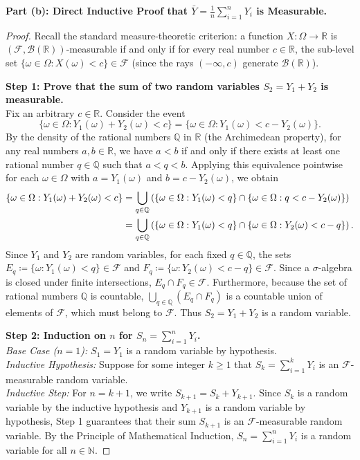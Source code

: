 \documentclass[11pt, letterpaper]{article}
\theoremstyle{definition}
\theoremstyle{remark}
\newcommand{\R}{\mathbb{R}}
\newcommand{\N}{\mathbb{N}}
\newcommand{\Q}{\mathbb{Q}}
\newcommand{\F}{\mathcal{F}}
\begin{document}
\textbf{Part (b): Direct Inductive Proof that $\bar{Y} = \frac{1}{n}\sum_{i=1}^n Y_i$ is Measurable.}
\begin{proof}
Recall the standard measure-theoretic criterion: a function $X : \Omega \to \R$ is $(\F, \mathcal{B}(\R))$-measurable if and only if for every real number $c \in \R$, the sub-level set $\{\omega \in \Omega : X(\omega) < c\} \in \F$ (since the rays $(-\infty, c)$ generate $\mathcal{B}(\R)$).

\textbf{Step 1: Prove that the sum of two random variables $S_2 = Y_1 + Y_2$ is measurable.} \\ \relax
Fix an arbitrary $c \in \R$. Consider the event
\[
    \{\omega \in \Omega : Y_1(\omega) + Y_2(\omega) < c\} = \{\omega \in \Omega : Y_1(\omega) < c - Y_2(\omega)\}.
\]
By the density of the rational numbers $\Q$ in $\R$ (the Archimedean property), for any real numbers $a, b \in \R$, we have $a < b$ if and only if there exists at least one rational number $q \in \Q$ such that $a < q < b$. Applying this equivalence pointwise for each $\omega \in \Omega$ with $a = Y_1(\omega)$ and $b = c - Y_2(\omega)$, we obtain
\begin{align*}
    \{\omega \in \Omega : Y_1(\omega) + Y_2(\omega) < c\} 
    &= \bigcup_{q \in \Q} \left( \{\omega \in \Omega : Y_1(\omega) < q\} \cap \{\omega \in \Omega : q < c - Y_2(\omega)\} \right) \\ \relax
    &= \bigcup_{q \in \Q} \left( \{\omega \in \Omega : Y_1(\omega) < q\} \cap \{\omega \in \Omega : Y_2(\omega) < c - q\} \right).
\end{align*}
Since $Y_1$ and $Y_2$ are random variables, for each fixed $q \in \Q$, the sets $E_q \coloneqq \{\omega : Y_1(\omega) < q\} \in \F$ and $F_q \coloneqq \{\omega : Y_2(\omega) < c - q\} \in \F$. Since a $\sigma$-algebra is closed under finite intersections, $E_q \cap F_q \in \F$. Furthermore, because the set of rational numbers $\Q$ is countable, $\bigcup_{q \in \Q} (E_q \cap F_q)$ is a countable union of elements of $\F$, which must belong to $\F$. Thus $S_2 = Y_1 + Y_2$ is a random variable.

\textbf{Step 2: Induction on $n$ for $S_n = \sum_{i=1}^n Y_i$.} \\ \relax
\emph{Base Case ($n=1$):} $S_1 = Y_1$ is a random variable by hypothesis. \\ \relax
\emph{Inductive Hypothesis:} Suppose for some integer $k \ge 1$ that $S_k = \sum_{i=1}^k Y_i$ is an $\F$-measurable random variable. \\ \relax
\emph{Inductive Step:} For $n = k+1$, we write $S_{k+1} = S_k + Y_{k+1}$. Since $S_k$ is a random variable by the inductive hypothesis and $Y_{k+1}$ is a random variable by hypothesis, Step 1 guarantees that their sum $S_{k+1}$ is an $\F$-measurable random variable. By the Principle of Mathematical Induction, $S_n = \sum_{i=1}^n Y_i$ is a random variable for all $n \in \N$.


\end{proof}
\end{document}

